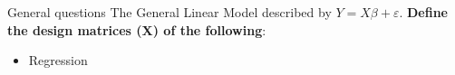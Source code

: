 \documentclass{beamer}
\begin{document}
\begin{frame}{General questions}
  The General Linear Model described by $Y=X\beta+\varepsilon$. \textbf{Define the design matrices (X) of the following}:

  \begin{itemize}
    \item Regression
  \end{itemize}

\end{frame}
\end{document}
